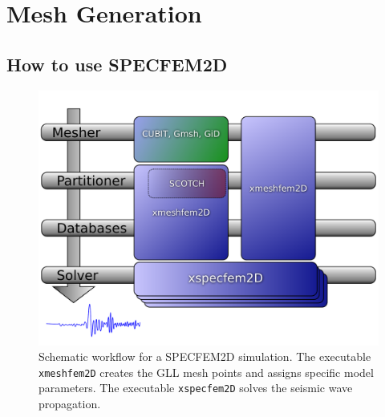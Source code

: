 \documentclass[oneside,english,onecolumn,letterpaper]{book}
\begin{document}

\chapter{Mesh Generation}


\section{How to use SPECFEM2D}

\begin{figure}[htbp]
\centering
\includegraphics[width=.6\textwidth]{figures/workflow}

\caption{Schematic workflow for a SPECFEM2D simulation. The executable \texttt{xmeshfem2D} creates the GLL mesh points and assigns specific model parameters. The executable \texttt{xspecfem2D} solves the seismic wave propagation.}

\label{fig:workflow.databases}
\end{figure}
\end{document}
